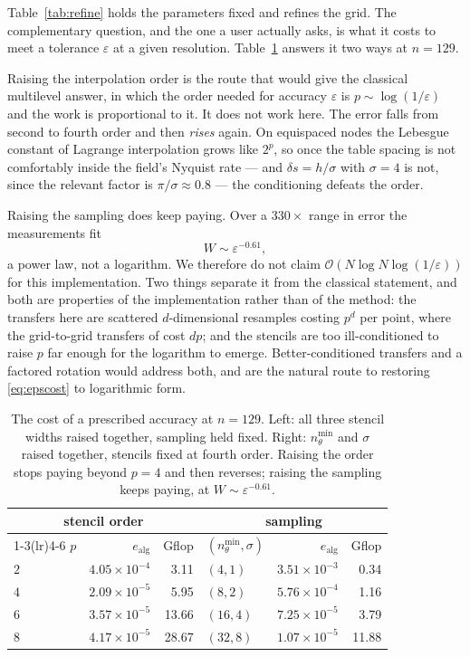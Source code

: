 \documentclass[11pt]{article}
\newcommand{\bigO}{\mathcal{O}}
\begin{document}
Table~\ref{tab:refine} holds the parameters fixed and refines the grid. The
complementary question, and the one a user actually asks, is what it costs to
meet a tolerance $\varepsilon$ at a given resolution.
Table~\ref{tab:accuracy_cost} answers it two ways at $n=129$.

Raising the interpolation order is the route that would give the classical
multilevel answer, in which the order needed for accuracy $\varepsilon$ is
$p\sim\log(1/\varepsilon)$ and the work is proportional to it. It does not work
here. The error falls from second to fourth order and then \emph{rises} again.
On equispaced nodes the Lebesgue constant of Lagrange interpolation grows like
$2^p$, so once the table spacing is not comfortably inside the field's Nyquist
rate --- and $\delta s=h/\sigma$ with $\sigma=4$ is not, since the relevant
factor is $\pi/\sigma\approx0.8$ --- the conditioning defeats the order.

Raising the sampling does keep paying. Over a $330\times$ range in error the
measurements fit
\begin{equation}
  W \sim \varepsilon^{-0.61},
  \label{eq:epscost}
\end{equation}
a power law, not a logarithm. We therefore do not claim
$\bigO(N\log N\log(1/\varepsilon))$ for this implementation. Two things separate
it from the classical statement, and both are properties of the implementation
rather than of the method: the transfers here are scattered $d$-dimensional
resamples costing $p^d$ per point, where the grid-to-grid transfers of
\citep{brandtlubrecht1990} cost $dp$; and the stencils are too ill-conditioned
to raise $p$ far enough for the logarithm to emerge. Better-conditioned
transfers and a factored rotation would address both, and are the natural route
to restoring \eqref{eq:epscost} to logarithmic form.

\begin{table}[t]
\centering\small
\caption{The cost of a prescribed accuracy at $n=129$. Left: all
three stencil widths raised together, sampling held fixed. Right:
$n_\theta^{\min}$ and $\sigma$ raised together, stencils fixed at fourth order.
Raising the order stops paying beyond $p=4$ and then reverses; raising the
sampling keeps paying, at $W\sim\varepsilon^{-0.61}$.}
\label{tab:accuracy_cost}
\begin{tabular}{lrr@{\qquad}lrr}
\toprule
\multicolumn{3}{c}{stencil order} &
\multicolumn{3}{c}{sampling}\\
\cmidrule(lr){1-3}\cmidrule(lr){4-6}
$p$ & $e_{\mathrm{alg}}$ & Gflop & $(n_\theta^{\min},\sigma)$ & $e_{\mathrm{alg}}$ & Gflop\\
\midrule
$2$ & $4.05\!\times\!10^{-4}$ & 3.11 & $(4,1)$ & $3.51\!\times\!10^{-3}$ & 0.34 \\
$4$ & $2.09\!\times\!10^{-5}$ & 5.95 & $(8,2)$ & $5.76\!\times\!10^{-4}$ & 1.16 \\
$6$ & $3.57\!\times\!10^{-5}$ & 13.66 & $(16,4)$ & $7.25\!\times\!10^{-5}$ & 3.79 \\
$8$ & $4.17\!\times\!10^{-5}$ & 28.67 & $(32,8)$ & $1.07\!\times\!10^{-5}$ & 11.88 \\
\bottomrule
\end{tabular}
\end{table}
\end{document}

